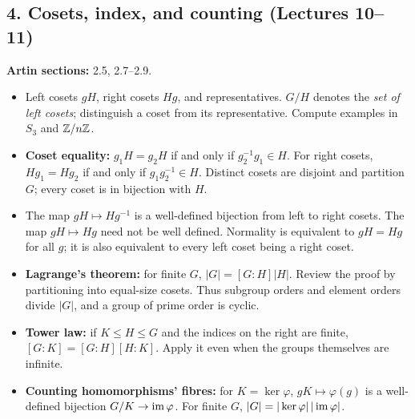 \documentclass[11pt,reqno]{amsart}
\begin{document}
\newpage
\subsection*{4. Cosets, index, and counting (Lectures 10--11)}
\noindent\textbf{Artin sections:} 2.5, 2.7--2.9.\par
\begin{itemize}
\item Left cosets $gH$, right cosets $Hg$, and representatives.
$G/H$ denotes the \emph{set of left cosets}; distinguish a coset from its representative.
Compute examples in $S_3$ and $\mathbb{Z}/n\mathbb{Z}$.
\item \textbf{Coset equality:} $g_1H=g_2H$ if and only if $g_2^{-1}g_1\in H$.
For right cosets, $Hg_1=Hg_2$ if and only if $g_1g_2^{-1}\in H$.
Distinct cosets are disjoint and partition $G$; every coset is in bijection with $H$.
\item The map $gH\mapsto Hg^{-1}$ is a well-defined bijection from left to right
cosets. The map $gH\mapsto Hg$ need not be well defined.
Normality is equivalent to $gH=Hg$ for all $g$; it is also equivalent to
 every left coset being a right coset.
\item \textbf{Lagrange's theorem:} for finite $G$, $|G|=[G:H]|H|$.
Review the proof by partitioning into equal-size cosets. Thus subgroup orders and
element orders divide $|G|$, and a group of prime order is cyclic.
\item \textbf{Tower law:} if $K\leq H\leq G$ and the indices on the right are finite,
$[G:K]=[G:H][H:K]$. Apply it even when the groups themselves are infinite.
\item \textbf{Counting homomorphisms' fibres:} for $K=\ker\varphi$,
$gK\mapsto\varphi(g)$ is a well-defined bijection $G/K\to\operatorname{im}\varphi$.
For finite $G$, $|G|=|\ker\varphi|\,|\operatorname{im}\varphi|$.
\end{itemize}
\end{document}
